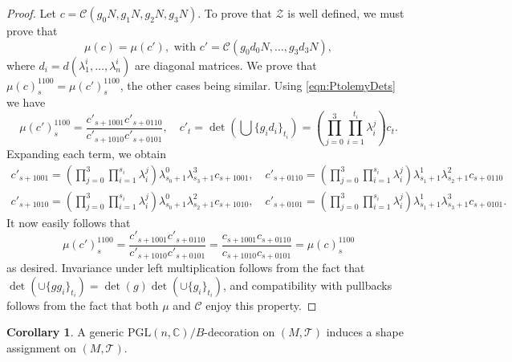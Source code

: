 \documentclass[12pt]{amsart}
\theoremstyle{definition}
\newtheorem{corollary}[theorem]{Corollary}
\numberwithin{equation}{section}
\def\PGL{\mathrm{PGL}}
\def\C{\mathbb{C}}
\def\T{\mathcal{T}}
\begin{document}
\begin{proof}
Let $c=\mathcal C(g_0N,g_1N,g_2N,g_3N)$.
To prove that $\mathcal Z$ is well defined, we must prove that 
\begin{equation}\mu(c)=\mu(c'),\text{ with } c'=\mathcal C(g_0d_0N,\dots,g_3d_3N),
\end{equation}
where $d_i=d(\lambda^i_1,\dots,\lambda^i_n)$ are diagonal matrices. We prove that $\mu(c)_s^{1100}=\mu(c')^{1100}_s$, the other cases being similar.
Using \eqref{eqn:PtolemyDets} we have
\begin{equation}\mu(c')_s^{1100}=\frac{c'_{s+1001}c'_{s+0110}}{c'_{s+1010}c'_{s+0101}},\quad c'_t=\det(\bigcup\{g_id_i\}_{t_i})=\left(\prod_{j=0}^{3}\prod_{i=1}^{t_i} \lambda^j_i\right) c_t.
\end{equation}
Expanding each term, we obtain
\begin{equation}
\begin{gathered}
c'_{s+1001} = \left(\prod_{j=0}^{3}\prod_{i=1}^{s_i} \lambda^j_i\right) \lambda^0_{s_0+1} \lambda^3_{s_3+1} c_{s+1001},\quad
c'_{s+0110} = \left(\prod_{j=0}^{3}\prod_{i=1}^{s_i} \lambda^j_i\right) \lambda^1_{s_1+1} \lambda^2_{s_2+1} c_{s+0110}\\
c'_{s+1010} = \left(\prod_{j=0}^{3}\prod_{i=1}^{s_i} \lambda^j_i\right) \lambda^0_{s_0+1} \lambda^2_{s_2+1} c_{s+1010},\quad
c'_{s+0101} = \left(\prod_{j=0}^{3}\prod_{i=1}^{s_i} \lambda^j_i\right) \lambda^1_{s_1+1} \lambda^3_{s_3+1} c_{s+0101}.
\end{gathered}
\end{equation}
It now easily follows that 
\begin{equation}
\mu(c')_s^{1100}=\frac{c'_{s+1001}c'_{s+0110}}{c'_{s+1010}c'_{s+0101}}=\frac{c_{s+1001}c_{s+0110}}{c_{s+1010}c_{s+0101}}=\mu(c)_s^{1100}
\end{equation}
as desired. Invariance under left multiplication follows from the fact that $\det(\cup\{gg_i\}_{t_i})=\det(g)\det(\cup\{g_i\}_{t_i})$, and compatibility with pullbacks follows from the fact that both $\mu$ and $\mathcal C$ enjoy this property. 
\end{proof}

\begin{corollary}
A generic $\PGL(n,\C)/B$-decoration on $(M,\T)$ induces a shape assignment on $(M,\T)$.
\end{corollary}
\end{document}
